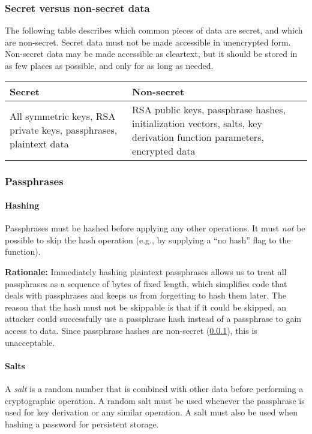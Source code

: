 \documentclass[]{article}
\begin{document}
\subsubsection{Secret versus non-secret data}
\label{sec:secret}
The following table describes which common pieces of data are secret, and which are non-secret. Secret data must not be made accessible in unencrypted form. Non-secret data may be made accessible as cleartext, but it should be stored in as few places as possible, and only for as long as needed. 

\begin{tabular}{p{}|p{}}
\textbf{Secret} & \textbf{Non-secret} \\
\hline
All symmetric keys, RSA private keys, passphrases, plaintext data & RSA public keys, passphrase hashes, initialization vectors, salts, key derivation function parameters, encrypted data
\end{tabular}

\subsubsection{Passphrases}
\paragraph{Hashing}
\label{sec:passphrases:hashing}
Passphrases must be hashed before applying any other operations. It must \emph{not} be possible to skip the hash operation (e.g., by supplying a ``no hash'' flag to the function).

\textbf{Rationale:} Immediately hashing plaintext passphrases allows us to treat all passphrases as a sequence of bytes of fixed length, which simplifies code that deals with passphrases and keeps us from forgetting to hash them later. The reason that the hash must not be skippable is that if it could be skipped, an attacker could successfully use a passphrase hash instead of a passphrase to gain access to data. Since passphrase hashes are non-secret (\ref{sec:secret}), this is unacceptable.

\paragraph{Salts}
\label{sec:passphrases:salts}
A \emph{salt} is a random number that is combined with other data before performing a cryptographic operation. A random salt must be used whenever the passphrase is used for key derivation or any similar operation. A salt must also be used when hashing a password for persistent storage. 
\end{document}
